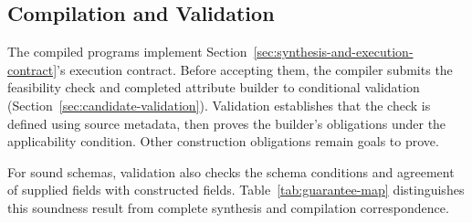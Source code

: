 \subsection{Compilation and Validation}
\label{sec:compilation-and-validation}
The compiled programs implement Section~\ref{sec:synthesis-and-execution-contract}'s execution
contract. Before accepting them, the compiler submits the feasibility
check and completed attribute builder to conditional validation
(Section~\ref{sec:candidate-validation}). Validation establishes that the
check is defined using source metadata, then proves the builder's
obligations under the applicability condition. Other construction
obligations remain goals to prove.

For sound schemas, validation also checks the schema conditions and
agreement of supplied fields with constructed fields. Table~\ref{tab:guarantee-map}
distinguishes this soundness result from complete synthesis and compilation
correspondence.
